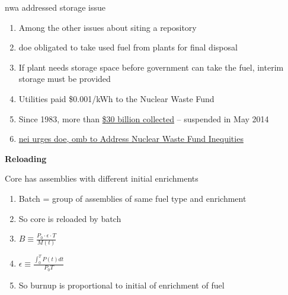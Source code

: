 \documentclass[aspectratio=1610,pdftex,dvipsnames,compress,xcolor={dvipsnames}]{beamer}
\newcommand{\acs}{\acrshort} %
\begin{document}
\begin{frame}{\acs{nwa} addressed storage issue}
    \begin{enumerate}[series=outerlist,topsep=0pt,itemsep=15pt,leftmargin=*,label=(\arabic*)]
        \item[]Among the other issues about siting a repository
        \item[]\acs{doe} obligated to take used fuel from plants for final disposal
        \item[]If plant needs storage space before government can take the fuel, interim storage must be provided
        \item[]Utilities paid \$0.001/kWh to the Nuclear Waste Fund
        \item[]Since 1983, more than \href{https://www.nei.org/resources/statistics/nuclear-waste-fund-payment-information-by-state}{\$30 billion collected} -- suspended in May 2014
        \item[]\href{https://electricenergyonline.com/article/energy/category/generation/52/636743/nei-urges-doe-omb-to-address-nuclear-waste-fund-inequities.html}{\acs{nei} urges \acs{doe}, \acs{omb} to Address Nuclear Waste Fund Inequities}
    \end{enumerate}
\end{frame}


\begin{frame}[plain]{}
    \centering\LARGE\textbf{Reloading}
\end{frame}


\addtocounter{framenumber}{-1} 
\begin{frame}{Core has assemblies with different initial enrichments}
    \begin{enumerate}[series=outerlist,topsep=0pt,itemsep=21pt,leftmargin=*,label=(\arabic*)]
        \item[]Batch = group of assemblies of same fuel type and enrichment
        \item[]So core is reloaded by batch
        \item[]$B \equiv \frac{P_0 \cdot \epsilon \cdot T}{M(t)}$
        \item[]$\epsilon \equiv \frac{\int_0^T P(t) dt}{P_0 T}$
        \item[]So burnup is proportional to initial of enrichment of fuel
    \end{enumerate}
\end{frame}
\end{document}
